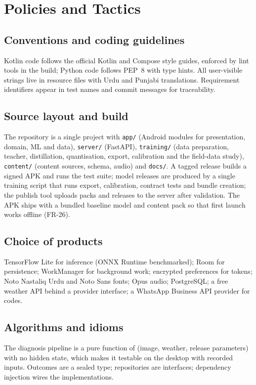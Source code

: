 \section{Policies and Tactics}
\subsection{Conventions and coding guidelines}
Kotlin code follows the official Kotlin and Compose style guides, enforced by lint tools in the build; Python code follows PEP~8 with type hints. All user-visible strings live in resource files with Urdu and Punjabi translations. Requirement identifiers appear in test names and commit messages for traceability.

\subsection{Source layout and build}
The repository is a single project with \texttt{app/} (Android modules for presentation, domain, ML and data), \texttt{server/} (FastAPI), \texttt{training/} (data preparation, teacher, distillation, quantisation, export, calibration and the field-data study), \texttt{content/} (content sources, schema, audio) and \texttt{docs/}. A tagged release builds a signed APK and runs the test suite; model releases are produced by a single training script that runs export, calibration, contract tests and bundle creation; the publish tool uploads packs and releases to the server after validation. The APK ships with a bundled baseline model and content pack so that first launch works offline (FR-26).

\subsection{Choice of products}
TensorFlow Lite for inference (ONNX Runtime benchmarked); Room for persistence; WorkManager for background work; encrypted preferences for tokens; Noto Nastaliq Urdu and Noto Sans fonts; Opus audio; PostgreSQL; a free weather API behind a provider interface; a WhatsApp Business API provider for codes.

\subsection{Algorithms and idioms}
The diagnosis pipeline is a pure function of (image, weather, release parameters) with no hidden state, which makes it testable on the desktop with recorded inputs. Outcomes are a sealed type; repositories are interfaces; dependency injection wires the implementations.

